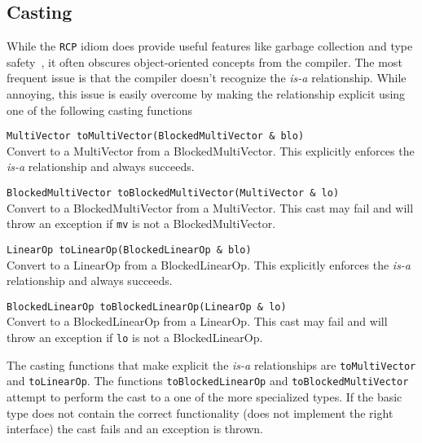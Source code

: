 \documentclass[12pt]{article}
\newcommand{\code}[1]{\lstinline[basicstyle=\footnotesize]!#1!}
\newcommand{\scode}[1]{\lstinline[basicstyle=\small\bfseries]!#1!}
\begin{document}
\subsection{Casting}
While the \code{RCP} idiom does provide useful features like garbage collection
and type safety~\cite{Bar2007-SAND}, it often obscures object-oriented concepts from the compiler.
The most frequent issue is that the compiler doesn't recognize the \emph{is-a} relationship.
While annoying, this issue is easily overcome by making the relationship explicit using
one of the following casting functions
\begin{framed}
\scode{MultiVector toMultiVector(BlockedMultiVector & blo)}\\
Convert to a MultiVector from a BlockedMultiVector. This explicitly
enforces the \emph{is-a} relationship and always succeeds.

\vspace{10pt}
\scode{BlockedMultiVector toBlockedMultiVector(MultiVector & lo)}\\
Convert to a BlockedMultiVector from a MultiVector. This cast
may fail and will throw an exception if \code{mv} is not a
BlockedMultiVector.

\vspace{10pt}
\scode{LinearOp toLinearOp(BlockedLinearOp & blo)}\\
Convert to a LinearOp from a BlockedLinearOp.
This explicitly enforces the \emph{is-a} relationship
and always succeeds.

\vspace{10pt}
\scode{BlockedLinearOp toBlockedLinearOp(LinearOp & lo)}\\
Convert to a BlockedLinearOp from a LinearOp. This cast
may fail and will throw an exception if \code{lo} is not a
BlockedLinearOp.
\end{framed}
The casting functions that make explicit the \emph{is-a} relationships are
\code{toMultiVector} and \code{toLinearOp}. The functions \code{toBlockedLinearOp}
and \code{toBlockedMultiVector} attempt to perform the cast to a one of the more
specialized types. If the basic type does not contain the correct functionality
(does not implement the right interface) the cast fails and an exception is
thrown.
\end{document}
